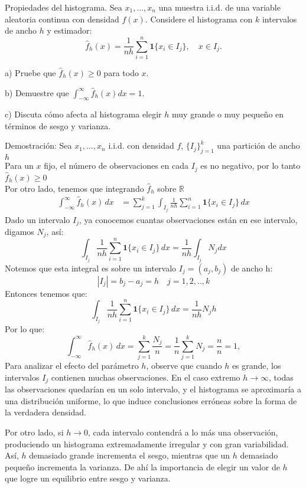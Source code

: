 \documentclass[a4paper,11pt]{article}
\begin{document}
\newpage
\begin{ejercicio}{12}
Propiedades del histograma. Sea $x_{1},\ldots,x_{n}$ una muestra i.i.d. de una variable aleatoria continua con densidad $f(x)$. Considere el histograma con $k$ intervalos de ancho $h$ y estimador: 
\[
\hat{f}_{h}(x) = \frac{1}{nh} \sum_{i=1}^{n} \mathbf{1}\{x_i \in I_j\}, \quad x \in I_j.
\]

a) Pruebe que $\hat{f}_{h}(x) \geq 0$ para todo $x$.

b) Demuestre que $\int_{-\infty}^{\infty} \hat{f}_{h}(x) dx = 1$.

c) Discuta cómo afecta al histograma elegir $h$ muy grande o muy pequeño en términos de sesgo y varianza.
\end{ejercicio}
\begin{demostracion}{Demostración:}
Sea \(x_1,\dots,x_n\) i.i.d. con densidad \(f\),  \(\{I_j\}_{j=1}^k\) una partición de ancho \(h\)\\
Para un \(x\) fijo, el número de observaciones en cada \(I_j\) es no negativo, por lo tanto $\hat{f}_h(x)\geq0$\\

Por otro lado, tenemos que integrando \(\hat f_h\) sobre \(\mathbb{R}\) 
\begin{align*}
    \int_{-\infty}^{\infty}\hat f_h(x)\,dx
&= \sum_{j=1}^k \int_{I_j} \frac{1}{n h}\sum_{i=1}^n \mathbf{1}\{x_i\in I_j\}\,dx
\end{align*}
Dado un intervalo \(I_j\), ya conocemos cuantas observaciones están en ese intervalo, digamos $N_j$, así:
\[
\int_{I_j}\frac{1}{n h} \sum_{i=1}^n \mathbf{1}\{x_i\in I_j\}\,dx
= \frac{1}{n h} \int_{I_j}N_jdx
\]
Notemos que esta integral es sobre un intervalo $I_j=(a_j,b_j)$ de ancho h:
\[
|I_j|=b_j-a_j=h\quad j=1,2,..,k
\]
Entonces tenemos que:
\[
\int_{I_j}\frac{1}{n h} \sum_{i=1}^n \mathbf{1}\{x_i\in I_j\}\,dx=\dfrac{1}{nh}N_jh
\]
Por lo que:
\[
\int_{-\infty}^{\infty}\hat f_h(x)\,dx = \sum_{j=1}^k \frac{N_j}{n} = \frac{1}{n}\sum_{j=1}^k N_j = \frac{n}{n}=1,
\]
Para analizar el efecto del parámetro $h$, observe que cuando $h$ es grande, los intervalos $I_j$ contienen muchas observaciones. En el caso extremo $h \to \infty$, todas las observaciones quedarían en un solo intervalo, y el histograma se aproximaría a una distribución uniforme, lo que induce conclusiones erróneas sobre la forma de la verdadera densidad. 

Por otro lado, si $h \to 0$, cada intervalo contendrá a lo más una observación, produciendo un histograma extremadamente irregular y con gran variabilidad. 
Así, $h$ demasiado grande incrementa el sesgo, mientras que un $h$ demasiado pequeño incrementa la varianza. De ahí la importancia de elegir un valor de $h$ que logre un equilibrio entre sesgo y varianza.

\end{demostracion}
\end{document}
